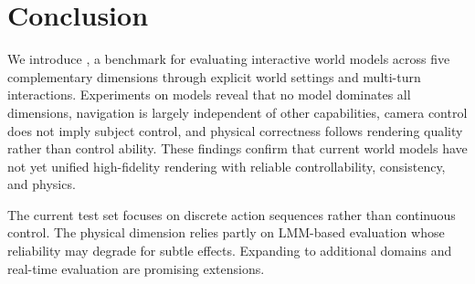 \section{Conclusion}
\label{sec:conclusion}

We introduce \benchmark, a benchmark for evaluating interactive world models across five complementary dimensions through explicit world settings and multi-turn interactions.
Experiments on \nummodel models reveal that no model dominates all dimensions, navigation is largely independent of other capabilities, camera control does not imply subject control, and physical correctness follows rendering quality rather than control ability.
These findings confirm that current world models have not yet unified high-fidelity rendering with reliable controllability, consistency, and physics.

The current test set focuses on discrete action sequences rather than continuous control. The physical dimension relies partly on LMM-based evaluation whose reliability may degrade for subtle effects. Expanding to additional domains and real-time evaluation are promising extensions.
